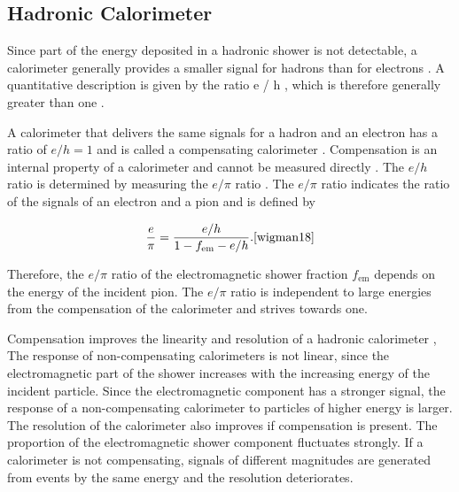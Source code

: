 \documentclass[12pt, a4paper]{thesis}
\begin{document}
\subsection{Hadronic Calorimeter}
\label{sec:orgd771604}

Since part of the energy deposited in a hadronic shower is not
detectable, a calorimeter generally provides a smaller signal for
hadrons than for electrons \cite{fabjan03}. A quantitative description
is given by the ratio e / h , which is therefore generally greater
than one \cite{wigman18}.

A calorimeter that delivers the same signals for a hadron and an
electron has a ratio of \(e / h = 1\) and is called a compensating
calorimeter \cite{wigman18}. Compensation is an internal property of a
calorimeter \cite{kolanoski16} and cannot be measured directly
\cite{wigman18}. The \(e / h\) ratio is determined by measuring the
\(e / \pi\) ratio \cite{wigman18}. The \(e / \pi\) ratio indicates the
ratio of the signals of an electron and a pion and is defined by

\begin{align}
\frac{e}{\pi}=\frac{e/h}{1-f_{\text{em}} - e/h}. \cite{wigman18}
\end{align}

Therefore, the \(e / \pi\) ratio of the electromagnetic shower fraction
\(f_{\text{em}}\) depends on the energy of the incident pion. The \(e / \pi\) ratio
is independent to large energies from the compensation of the calorimeter and
strives towards one.

Compensation improves the linearity and resolution of a hadronic calorimeter
\cite{wigman18,kolanoski16,fabjan03}, The response of non-compensating
calorimeters is not linear, since the electromagnetic part of the shower
increases with the increasing energy of the incident particle. Since the
electromagnetic component has a stronger signal, the response of a
non-compensating calorimeter to particles of higher energy is larger. The
resolution of the calorimeter also improves if compensation is present. The
proportion of the electromagnetic shower component fluctuates strongly. If a
calorimeter is not compensating, signals of different magnitudes are generated
from events by the same energy and the resolution deteriorates.
\end{document}
